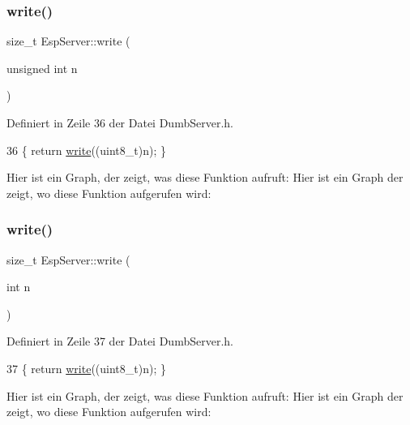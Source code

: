 \subsubsection{\texorpdfstring{write()}{write()}\hspace{0.1cm}{\footnotesize\ttfamily [5/6]}}
{\footnotesize\ttfamily size\+\_\+t Esp\+Server\+::write (\begin{DoxyParamCaption}\item[{unsigned int}]{n }\end{DoxyParamCaption})\hspace{0.3cm}{\ttfamily [inline]}}



Definiert in Zeile 36 der Datei Dumb\+Server.\+h.


\begin{DoxyCode}
36 \{ \textcolor{keywordflow}{return} \hyperlink{class_esp_server_a0756c42343195dd1d1aa2f61c9b095bf}{write}((uint8\_t)n); \}
\end{DoxyCode}
Hier ist ein Graph, der zeigt, was diese Funktion aufruft\+:
Hier ist ein Graph der zeigt, wo diese Funktion aufgerufen wird\+:
\mbox{\label{class_esp_server_a2a49890c886a2b0569b11e02f986f867}} 
\subsubsection{\texorpdfstring{write()}{write()}\hspace{0.1cm}{\footnotesize\ttfamily [6/6]}}
{\footnotesize\ttfamily size\+\_\+t Esp\+Server\+::write (\begin{DoxyParamCaption}\item[{int}]{n }\end{DoxyParamCaption})\hspace{0.3cm}{\ttfamily [inline]}}



Definiert in Zeile 37 der Datei Dumb\+Server.\+h.


\begin{DoxyCode}
37 \{ \textcolor{keywordflow}{return} \hyperlink{class_esp_server_a0756c42343195dd1d1aa2f61c9b095bf}{write}((uint8\_t)n); \}
\end{DoxyCode}
Hier ist ein Graph, der zeigt, was diese Funktion aufruft\+:
Hier ist ein Graph der zeigt, wo diese Funktion aufgerufen wird\+:


